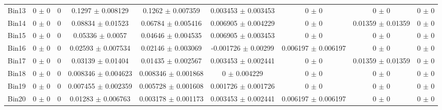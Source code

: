 \begin{tabular}{@{\extracolsep{4pt}}lcccccccc@{}}
     Bin13 & 0 $\pm$ 0 & 0 & 0.1297 $\pm$ 0.008129 & 0.1262 $\pm$ 0.007359 & 0.003453 $\pm$ 0.003453 & 0 $\pm$ 0 & 0 $\pm$ 0 & 0 $\pm$ 0 \\ 
     Bin14 & 0 $\pm$ 0 & 0 & 0.08834 $\pm$ 0.01523 & 0.06784 $\pm$ 0.005416 & 0.006905 $\pm$ 0.004229 & 0 $\pm$ 0 & 0.01359 $\pm$ 0.01359 & 0 $\pm$ 0 \\ 
     Bin15 & 0 $\pm$ 0 & 0 & 0.05336 $\pm$ 0.0057 & 0.04646 $\pm$ 0.004535 & 0.006905 $\pm$ 0.003453 & 0 $\pm$ 0 & 0 $\pm$ 0 & 0 $\pm$ 0 \\ 
     Bin16 & 0 $\pm$ 0 & 0 & 0.02593 $\pm$ 0.007534 & 0.02146 $\pm$ 0.003069 & -0.001726 $\pm$ 0.00299 & 0.006197 $\pm$ 0.006197 & 0 $\pm$ 0 & 0 $\pm$ 0 \\ 
     Bin17 & 0 $\pm$ 0 & 0 & 0.03139 $\pm$ 0.01404 & 0.01435 $\pm$ 0.002567 & 0.003453 $\pm$ 0.002441 & 0 $\pm$ 0 & 0.01359 $\pm$ 0.01359 & 0 $\pm$ 0 \\ 
     Bin18 & 0 $\pm$ 0 & 0 & 0.008346 $\pm$ 0.004623 & 0.008346 $\pm$ 0.001868 & 0 $\pm$ 0.004229 & 0 $\pm$ 0 & 0 $\pm$ 0 & 0 $\pm$ 0 \\ 
     Bin19 & 0 $\pm$ 0 & 0 & 0.007455 $\pm$ 0.002359 & 0.005728 $\pm$ 0.001608 & 0.001726 $\pm$ 0.001726 & 0 $\pm$ 0 & 0 $\pm$ 0 & 0 $\pm$ 0 \\ 
     Bin20 & 0 $\pm$ 0 & 0 & 0.01283 $\pm$ 0.006763 & 0.003178 $\pm$ 0.001173 & 0.003453 $\pm$ 0.002441 & 0.006197 $\pm$ 0.006197 & 0 $\pm$ 0 & 0 $\pm$ 0 \\ 
\hline\hline
  \end{tabular}

